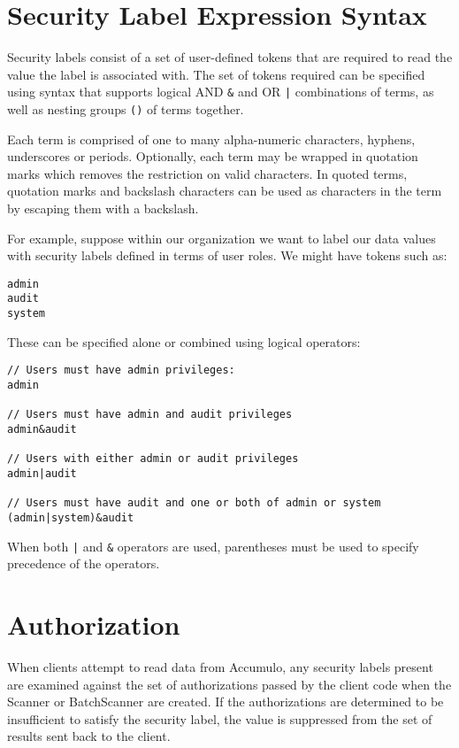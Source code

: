 \section{Security Label Expression Syntax}

Security labels consist of a set of user-defined tokens that are required to read the
value the label is associated with. The set of tokens required can be specified using
syntax that supports logical AND \verb^&^ and OR \verb^|^ combinations of terms, as
well as nesting groups \verb^()^ of terms together.

Each term is comprised of one to many alpha-numeric characters, hyphens, underscores or
periods. Optionally, each term may be wrapped in quotation marks
which removes the restriction on valid characters. In quoted terms, quotation marks
and backslash characters can be used as characters in the term by escaping them
with a backslash.

For example, suppose within our organization we want to label our data values with
security labels defined in terms of user roles. We might have tokens such as:

\begingroup\fontsize{8pt}{8pt}\selectfont\begin{verbatim}
admin
audit
system
\end{verbatim}\endgroup

These can be specified alone or combined using logical operators:

\begingroup\fontsize{8pt}{8pt}\selectfont\begin{verbatim}
// Users must have admin privileges:
admin

// Users must have admin and audit privileges
admin&audit

// Users with either admin or audit privileges
admin|audit

// Users must have audit and one or both of admin or system
(admin|system)&audit
\end{verbatim}\endgroup

When both \verb^|^ and \verb^&^ operators are used, parentheses must be used to specify
precedence of the operators.

\section{Authorization}

When clients attempt to read data from Accumulo, any security labels present are
examined against the set of authorizations passed by the client code when the
Scanner or BatchScanner are created. If the authorizations are determined to be
insufficient to satisfy the security label, the value is suppressed from the set of
results sent back to the client.

